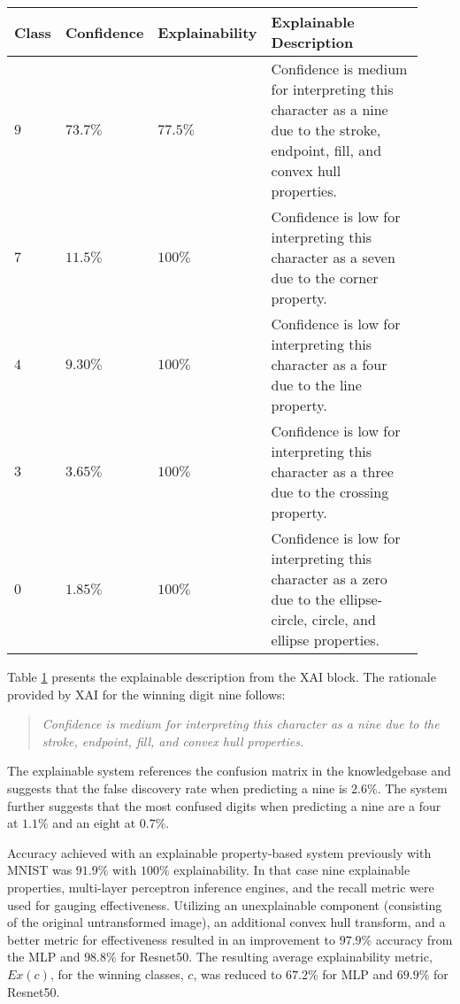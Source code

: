 \begin{table}[H]
    \renewcommand{\arraystretch}{1.3}
     \label{table:mnist_example3_explanation}
    \begin{center}
    \begin{tabular}{| m{0.06\linewidth} | m{0.14\linewidth} | m{0.17\linewidth} | m{0.55\linewidth} |}
    \hline
     Class & Confidence & Explainability & Explainable Description \\
    \hline \hline
    $9$ & $73.7\%$ & $77.5\%$ & Confidence is medium for interpreting this character as a nine due to the stroke, endpoint, fill, and convex hull properties. \\ 
    \hline
    $7$ & $11.5\%$ & $100\%$ & Confidence is low for interpreting this character as a seven due to the corner property. \\
    \hline
    $4$ & $9.30\%$ & $100\%$ & Confidence is low for interpreting this character as a four due to the line property. \\
    \hline
    $3$ & $3.65\%$ & $100\%$ & Confidence is low for interpreting this character as a three due to the crossing property. \\
    \hline
    $0$ & $1.85\%$ & $100\%$ & Confidence is low for interpreting this character as a zero due to the ellipse-circle, circle, and ellipse properties. \\
    \hline
    \end{tabular}
    \end{center}
\end{table}

Table \ref{table:mnist_example3_explanation} presents the explainable description from the
XAI block.  The rationale provided by XAI for the winning digit nine follows:

\begin{quote}
    \textit{Confidence is medium for interpreting this character as a nine due to the stroke, endpoint, fill, and convex hull properties.}
\end{quote}

The explainable system references the confusion matrix in the knowledgebase and
suggests that the false discovery rate when predicting a nine is $2.6\%$. The
system further suggests that the most confused digits when predicting a nine are
a four at $1.1\%$ and an eight at $0.7\%$.

Accuracy achieved with an explainable property-based system previously with
MNIST was $91.9\%$ with $100\%$ explainability\cite{whitten21}.  In that case
nine explainable properties, multi-layer perceptron inference engines, and the
recall metric were used for gauging effectiveness. Utilizing an unexplainable
component (consisting of the original untransformed image), an additional convex
hull transform, and a better metric for effectiveness resulted in an improvement
to $97.9\%$ accuracy from the MLP and $98.8\%$ for Resnet50. The resulting
average explainability metric, $Ex(c)$, for the winning classes, $c$, was
reduced to $67.2$\% for MLP and $69.9\%$ for Resnet50.

